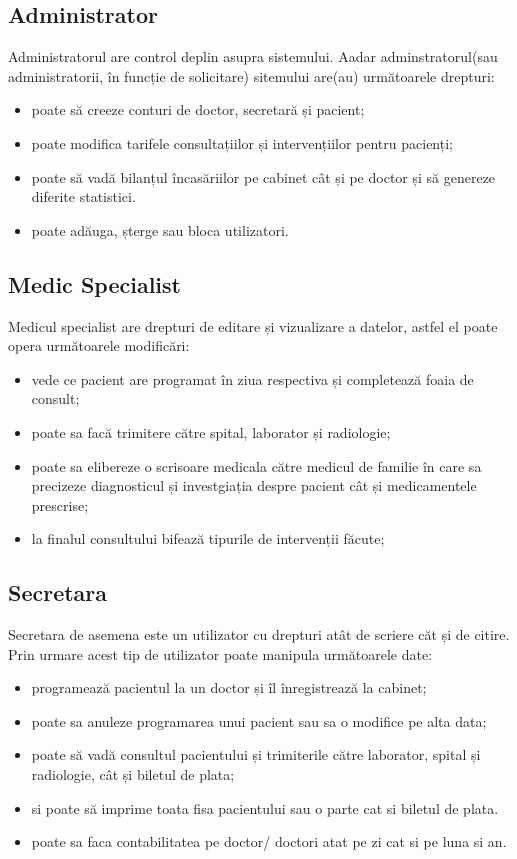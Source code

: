 \documentclass[a4paper,12pt]{article}
\begin{document}
\subsection{Administrator}

Administratorul are control deplin asupra sistemului. Aadar adminstratorul(sau administratorii,  în funcție de solicitare) sitemului are(au) următoarele drepturi:

\begin{itemize}
\item  poate să creeze conturi de doctor, secretară și pacient;
\item poate modifica tarifele consultațiilor și intervențiilor pentru pacienți;
\item poate să vadă bilanțul încasăriilor pe cabinet cât și pe doctor și să genereze diferite statistici.
\item poate adăuga, șterge sau bloca utilizatori.
\end{itemize}

\subsection{Medic Specialist}

Medicul specialist are drepturi de editare și vizualizare a datelor, astfel el poate opera următoarele modificări:

\begin{itemize}
\item vede ce pacient are programat în ziua respectiva și completează foaia de consult;
\item poate sa facă trimitere către spital, laborator și radiologie;
\item poate sa elibereze o scrisoare medicala către medicul de familie în care sa precizeze diagnosticul și investgiația despre pacient cât și medicamentele prescrise;
\item la finalul consultului bifează tipurile de intervenții făcute;
\end{itemize}

\subsection{Secretara}

Secretara de asemena este un utilizator cu drepturi atât de scriere căt și de citire. Prin urmare acest tip de utilizator poate manipula următoarele date:

\begin{itemize}
\item programează pacientul la un doctor și îl înregistrează la cabinet;
\item poate sa anuleze programarea unui pacient sau sa o modifice pe alta data;
\item poate să vadă consultul pacientului și trimiterile către laborator, spital și radiologie, cât și biletul de plata;
\item  si poate să imprime toata fisa pacientului sau o parte cat si biletul de plata.
\item poate sa faca contabilitatea pe doctor/ doctori atat pe zi cat si pe luna si an.
\end{itemize}
\end{document}

